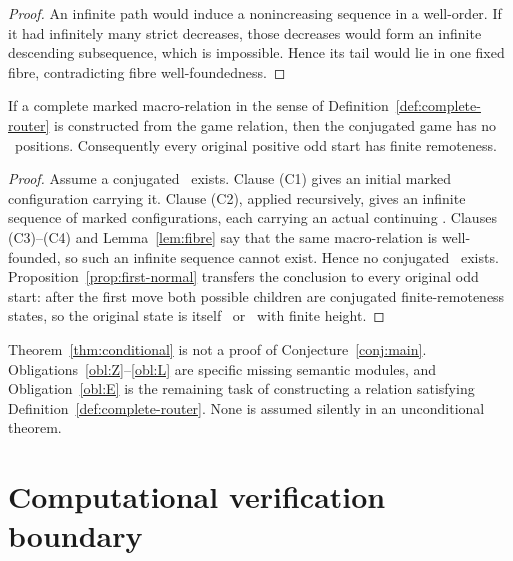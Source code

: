 \begin{proof}
An infinite path would induce a nonincreasing sequence in a well-order.  If
it had infinitely many strict decreases, those decreases would form an
infinite descending subsequence, which is impossible.  Hence its tail would
lie in one fixed fibre, contradicting fibre well-foundedness.
\end{proof}

\begin{theorem}\label{thm:conditional}
If a complete marked macro-relation in the sense of
Definition~\ref{def:complete-router} is constructed from the game relation,
then the conjugated game has no \DRAW\ positions.  Consequently every
original positive odd start has finite remoteness.
\end{theorem}

\begin{proof}
Assume a conjugated \DRAW\ exists.  Clause (C1) gives an initial marked
configuration carrying it.  Clause (C2), applied recursively, gives an
infinite sequence of marked configurations, each carrying an actual
continuing \DRAW.  Clauses (C3)--(C4) and
Lemma~\ref{lem:fibre} say that the same macro-relation is well-founded, so
such an infinite sequence cannot exist.  Hence no conjugated \DRAW\ exists.
Proposition~\ref{prop:first-normal} transfers the conclusion to every
original odd start: after the first move both possible children are
conjugated finite-remoteness states, so the original state is itself
\WIN\ or \LOSS\ with finite height.
\end{proof}

\begin{remark}
Theorem~\ref{thm:conditional} is not a proof of
Conjecture~\ref{conj:main}.  Obligations~\ref{obl:Z}--\ref{obl:L} are
specific missing semantic modules, and Obligation~\ref{obl:E} is the
remaining task of constructing a relation satisfying
Definition~\ref{def:complete-router}.  None is assumed silently in an
unconditional theorem.
\end{remark}

\section{Computational verification boundary}

